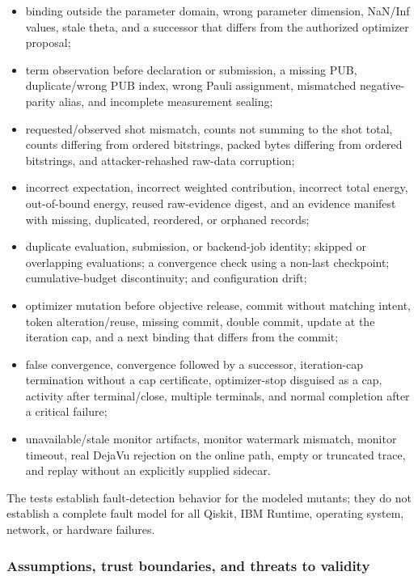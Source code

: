 \begin{itemize}
  \item binding outside the parameter domain, wrong parameter dimension,
        NaN/Inf values, stale theta, and a successor that differs from the
        authorized optimizer proposal;
  \item term observation before declaration or submission, a missing PUB,
        duplicate/wrong PUB index, wrong Pauli assignment, mismatched
        negative-parity alias, and incomplete measurement sealing;
  \item requested/observed shot mismatch, counts not summing to the shot total,
        counts differing from ordered bitstrings, packed bytes differing from
        ordered bitstrings, and attacker-rehashed raw-data corruption;
  \item incorrect expectation, incorrect weighted contribution, incorrect
        total energy, out-of-bound energy, reused raw-evidence digest, and an
        evidence manifest with missing, duplicated, reordered, or orphaned
        records;
  \item duplicate evaluation, submission, or backend-job identity; skipped or
        overlapping evaluations; a convergence check using a non-last
        checkpoint; cumulative-budget discontinuity; and configuration drift;
  \item optimizer mutation before objective release, commit without matching
        intent, token alteration/reuse, missing commit, double commit, update at
        the iteration cap, and a next binding that differs from the commit;
  \item false convergence, convergence followed by a successor, iteration-cap
        termination without a cap certificate, optimizer-stop disguised as a
        cap, activity after terminal/close, multiple terminals, and normal
        completion after a critical failure;
  \item unavailable/stale monitor artifacts, monitor watermark mismatch,
        monitor timeout, real DejaVu rejection on the online path, empty or
        truncated trace, and replay without an explicitly supplied sidecar.
\end{itemize}

The tests establish fault-detection behavior for the modeled mutants; they do
not establish a complete fault model for all Qiskit, IBM Runtime, operating
system, network, or hardware failures.

\subsubsection{Assumptions, trust boundaries, and threats to validity}

